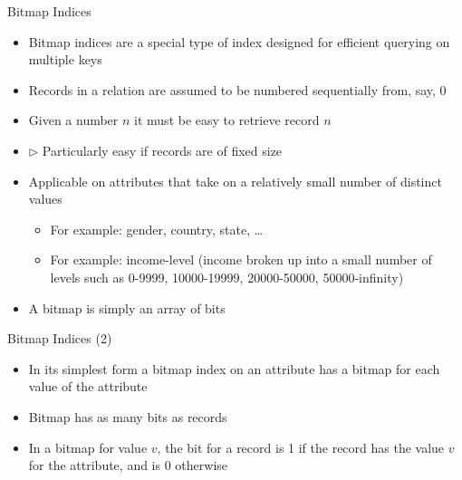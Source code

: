 \documentclass[aspectratio=169, xcolor=dvipsnames]{beamer}
\begin{document}
\begin{frame}{Bitmap Indices}
    \begin{itemize}[<+->]
        \item Bitmap indices are a special type of index designed for efficient querying on multiple keys
        \item Records in a relation are assumed to be numbered sequentially from, say, 0
        \item Given a number $n$ it must be easy to retrieve record $n$
        \item $\triangleright$ Particularly easy if records are of fixed size
        \item Applicable on attributes that take on a relatively small number of distinct values
        \begin{itemize}[<+->]
            \item For example: gender, country, state, \dots
            \item For example: income-level (income broken up into a small number of levels such as 0-9999, 10000-19999, 20000-50000, 50000-infinity)
        \end{itemize}
        \item A bitmap is simply an array of bits
    \end{itemize}
\end{frame}

\begin{frame}{Bitmap Indices (2)}
    \begin{itemize}[<+->]
        \item In its simplest form a bitmap index on an attribute has a bitmap for each value of the attribute
        \item Bitmap has as many bits as records
        \item In a bitmap for value $v$, the bit for a record is 1 if the record has the value $v$ for the attribute, and is 0 otherwise
    \end{itemize}
\end{frame}
\end{document}
